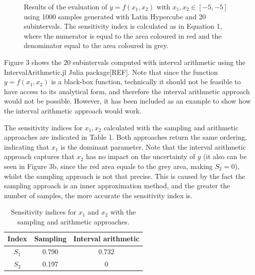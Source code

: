 \documentclass[twocolumn]{rps-esrel2022}
\begin{document}
\begin{figure}
	\caption{Results of the evaluation of $y=f(x_1,x_2)$ with $x_1,x_2 \in [-5,-5]$ using 1000 samples generated with Latin Hypercube and 20 subintervals.
	The sensitivity index is calculated as in Equation 1, where the numerator is equal to the area coloured in red and the denominator
	equal to the area coloured in grey.}
	\label{fig:myfig}
\end{figure}

Figure 3 shows the 20 subintervals computed with interval arithmetic using the IntervalArithmetic.jl Julia package[REF].
Note that since the function $y = f(x_1,x_2)$ is a black-box function, technically it should not be feasible to have access to
its analytical form, and therefore the interval arithmetic approach would not be possible.
However, it has been included as an example to show how the interval arithmetic approach would work.

The sensitivity indices for $x_1,x_2$ calculated with the sampling and arithmetic approaches are indicated in Table 1.
Both approaches return the same ordering, indicating that $x_1$ is the dominant parameter.
Note that the interval arithmetic approach captures that $x_2$ has no impact on the uncertainty of $y$ (it also can be seen in Figure 3b, since the
red area equals to the grey area, making $S_2 = 0$), whilst the sampling approach is not that precise.
This is caused by the fact the sampling approach is an inner approximation method, and the greater the number of samples,
the more accurate the sensitivity index is.

\begin{table}[!h]
	\centering
	\caption{Sensitivity indices for $x_1$ and $x_2$ with the sampling and arithmetic approaches.}
	\begin{tabular}{ccc}
	\hline
	Index & Sampling & Interval arithmetic \\ \hline
	$S_1$ & 0.790    & 0.732               \\
	$S_2$ & 0.197    & 0                   \\ \hline
	\end{tabular}%
\end{table}
\end{document}

